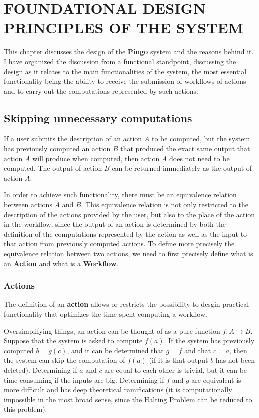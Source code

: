 \chapter{FOUNDATIONAL DESIGN PRINCIPLES OF THE SYSTEM}
\label{chap:foundational}
This chapter discusses the design of the \textbf{Pingo} system and the reasons behind it.  I have organized the discussion from a functional standpoint, discussing the design as it relates to the main functionalities of the system, the most essential functionality being the ability to receive the submission of workflows of actions and to carry out the computations represented by such actions.

\section{Skipping unnecessary computations}
If a user submits the description of an action $A$ to be computed, but the system has previously computed an action $B$ that produced the exact same output that action $A$ will produce when computed, then action $A$ does not need to be computed.  The output of action $B$ can be returned immediately as the output of action $A$.  

In order to achieve such functionality, there must be an equivalence relation between actions $A$ and $B$. This equivalence relation is not only restricted to the description of the actions provided by the user, but also to the place of the action in the workflow, since the output of an action is determined by both the definition of the computations represented by the action as well as the input to that action from previously computed actions. To define more precisely the equivalence relation between two actions, we need to first precisely define what is an \textbf{Action} and what is a \textbf{Workflow}.

\subsection{Actions}
The definition of an \textbf{action} allows or restricts the possibility to desgin practical functionality that optimizes the time spent computing a workflow. 

Oversimplifying things, an action can be thought of as a pure function $f:A \rightarrow B$.  Suppose that the system is asked to compute $f(a)$.  If the system has previously computed $b=g(c)$, and it can be determined that $g=f$ and that $c=a$, then the system can skip the computation of $f(a)$ (if it is that output $b$ has not been deleted).  Determining if $a$ and $c$ are equal to each other is trivial, but it can be time consuming if the inputs are big.  Determining if $f$ and $g$ are equivalent is more difficult and has deep theoretical ramifications (it is computationally impossible in the most broad sense, since the Halting Problem can be reduced to this problem).


